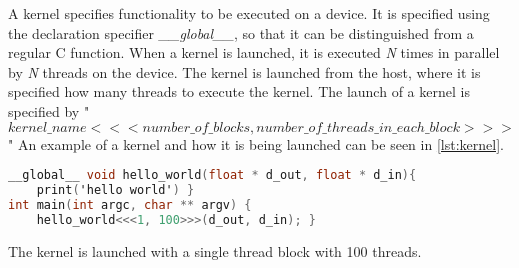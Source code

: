 A kernel specifies functionality to be executed on a device.
It is specified using the declaration specifier \textit{\_\_global\_\_}, so that it can be distinguished from a regular C function.
When a kernel is launched, it is executed \textit{N} times in parallel by \textit{N} threads on the device.
The kernel is launched from the host, where it is specified how many \cuda{} threads to execute the kernel.
The launch of a kernel is specified by "$kernel\_name<<< number\_of\_blocks, number\_of\_threads\_in\_each\_block >>>$"
An example of a kernel and how it is being launched can be seen in \autoref{lst:kernel}.
\begin{lstlisting}[language=C,caption={Kernel example},label=lst:kernel]
__global__ void hello_world(float * d_out, float * d_in){
	print('hello world') }
int main(int argc, char ** argv) {
	hello_world<<<1, 100>>>(d_out, d_in); }
\end{lstlisting}
The kernel is launched with a single thread block with 100 threads.